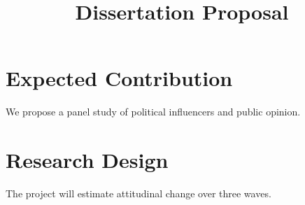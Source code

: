 \documentclass{article}
\begin{document}
\title{Dissertation Proposal}
\maketitle

\section{Expected Contribution}
We propose a panel study of political influencers and public opinion.

\section{Research Design}
The project will estimate attitudinal change over three waves.
\end{document}
